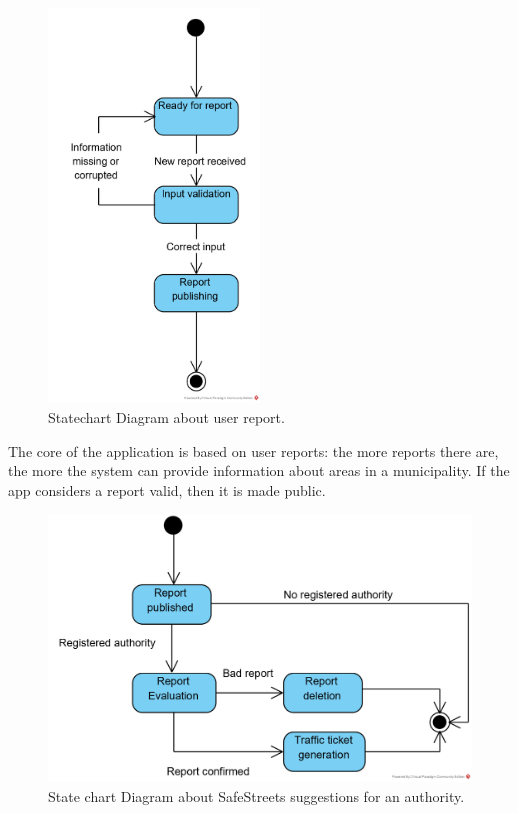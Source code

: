 \documentclass{article}
\begin{document}
			\begin{figure}[H]
				\centering
				\includegraphics[width=0.5\textwidth]{diagrams/statechart_UserSS.png}
				\caption[Statechart Diagram1]{Statechart Diagram about user report.}
				\label{fig:statechart_userReporting}
			\end{figure}
			
			The core of the application is based on user reports: the more reports there are, the more the system can provide information about areas in a municipality. If the app considers a report valid, then it is made public.
			
			\begin{figure}[H]
				\centering
				\includegraphics {diagrams/statechart_AuthoritySS.png}
				\caption[State chart Diagram2]{State chart Diagram about SafeStreets suggestions for an authority.}
				\label{fig:statechart_SuggestionsForAuthority}
			\end{figure}
			
\end{document}
